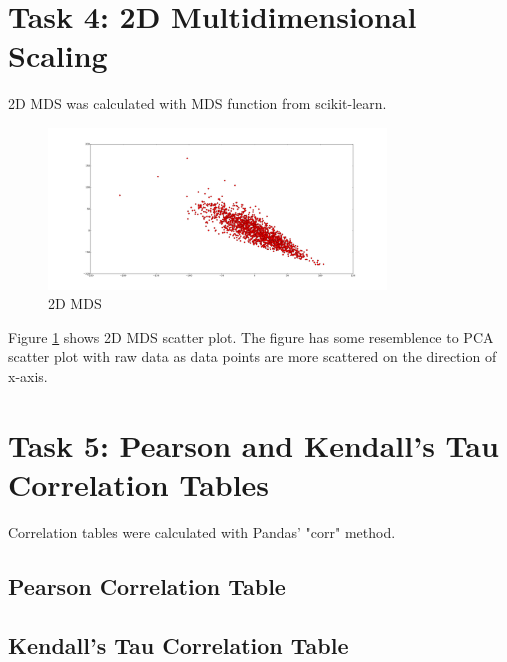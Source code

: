 \documentclass[12pt]{article}
\begin{document}
\section{Task 4: 2D Multidimensional Scaling}

2D MDS was calculated with MDS function from scikit-learn.

\begin{figure}[H]
    \centering
    \includegraphics[width=0.8\textwidth]{2d_mds}
    \caption{2D MDS}
    \label{fig:mds}
\end{figure}

Figure \ref{fig:mds} shows 2D MDS scatter plot. The figure has some resemblence to PCA scatter plot with raw data as data points are more scattered on the direction of x-axis.

\section{Task 5: Pearson and Kendall's Tau Correlation Tables}

Correlation tables were calculated with Pandas' "corr" method.

\subsection{Pearson Correlation Table}

\resizebox{\linewidth}{!}{%



}

\subsection{Kendall's Tau Correlation Table}

\resizebox{\linewidth}{!}{%



}
\end{document}
